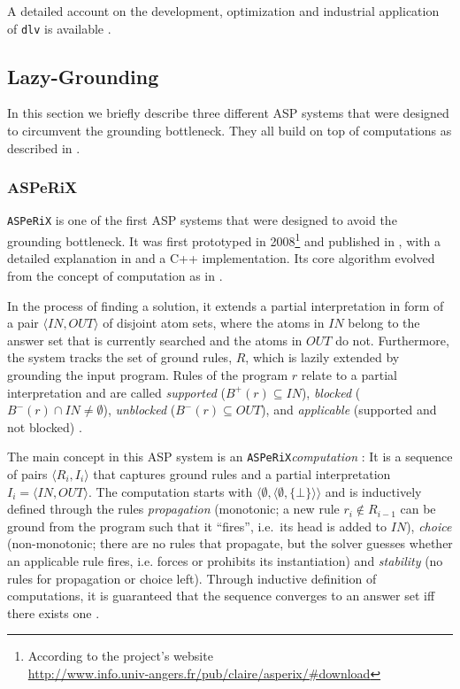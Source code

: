 \documentclass{vutinfth} %
\newcommand{\bodyf}{B}
\newcommand{\asperix}{\texttt{ASPeRiX}\xspace}
\newcommand{\dlv}{\texttt{dlv}\xspace}
\begin{document}
A detailed account on the development, optimization and industrial application of \dlv is available \cite{dlvproject}.

\subsection{Lazy-Grounding}

In this section we briefly describe three different ASP systems that were designed to circumvent the grounding bottleneck. They all build on top of computations as described in \cite{computations}.

\subsubsection{ASPeRiX}
\label{sec:asperix}

\asperix is one of the first ASP systems that were designed to avoid the grounding bottleneck. It was first prototyped in 2008\footnote{According to the project's website\\ \url{http://www.info.univ-angers.fr/pub/claire/asperix/\#download}} and published in \cite{asperixfirst,fofchain}, with a detailed explanation in \cite{asperix} and a C++ implementation. Its core algorithm evolved from the concept of computation as in \cite{computations}.

In the process of finding a solution, it extends a partial interpretation \cite[Def.~4]{asperix} in form of a pair $\langle IN, OUT \rangle$ of disjoint atom sets, where the atoms in $IN$ belong to the answer set that is currently searched and the atoms in $OUT$ do not. Furthermore, the system tracks the set of ground rules, $R$, which is lazily extended by grounding the input program. Rules of the program $r$ relate to a partial interpretation and are called \emph{supported} ($\bodyf^+(r) \subseteq IN$), \emph{blocked} ($\bodyf^-(r) \cap IN \not = \emptyset$), \emph{unblocked} ($\bodyf^-(r) \subseteq OUT$), and \emph{applicable} (supported and not blocked) \cite[Def.~5]{asperix}. 

The main concept in this ASP system is an \asperix \emph{computation} \cite[Def.~7]{asperix}: It is a sequence of pairs $\langle R_i, I_i \rangle$ that captures ground rules and a partial interpretation $I_i = \langle IN, OUT \rangle$. The computation starts with $\langle \emptyset, \langle \emptyset, \{ \bot \} \rangle \rangle$ and is inductively defined through the rules \emph{propagation} (monotonic; a new rule $r_i \not \in R_{i-1}$ can be ground from the program such that it \enquote{fires}, i.e.~its head is added to $IN$), \emph{choice} (non-monotonic; there are no rules that propagate, but the solver guesses whether an applicable rule fires, i.e. forces or prohibits its instantiation) and \emph{stability} (no rules for propagation or choice left). Through inductive definition of computations, it is guaranteed that the sequence converges to an answer set iff there exists one \cite[Thm.~2]{asperix}.
\end{document}
